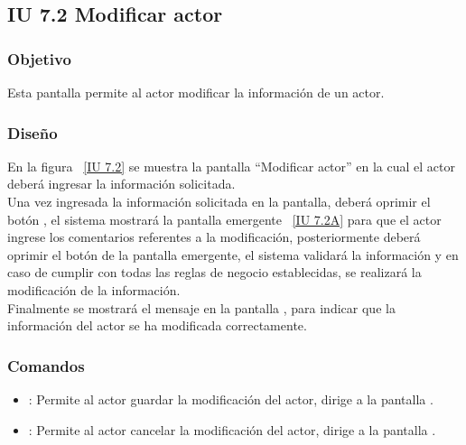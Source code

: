 \subsection{IU 7.2 Modificar actor}

\subsubsection{Objetivo}
	
	Esta pantalla permite al actor modificar la información de un actor.

\subsubsection{Diseño}

    En la figura ~\ref{IU 7.2} se muestra la pantalla ``Modificar actor'' en la cual el actor deberá ingresar la información solicitada. \\
    
    Una vez ingresada la información solicitada en la pantalla, deberá oprimir el botón , el sistema mostrará la pantalla emergente ~\ref{IU 7.2A} 
    para que el actor ingrese los comentarios referentes a la modificación, posteriormente deberá oprimir el botón  de la pantalla emergente, 
    el sistema validará la información y en caso de cumplir con todas las reglas de negocio establecidas, se realizará la modificación de la información.\\
    
    Finalmente se mostrará el mensaje  en la pantalla , para indicar que la información del actor se ha modificada correctamente.        



\subsubsection{Comandos}
\begin{itemize}
	\item {}: Permite al actor guardar la modificación del actor, dirige a la pantalla .
	\item {}: Permite al actor cancelar la modificación del actor, dirige a la pantalla .
\end{itemize}

